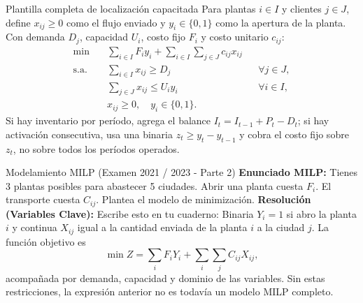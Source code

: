 \begin{formulas}{Plantilla completa de localización capacitada}
Para plantas $i\in I$ y clientes $j\in J$, define $x_{ij}\ge0$ como el flujo
enviado y $y_i\in\{0,1\}$ como la apertura de la planta. Con demanda
$D_j$, capacidad $U_i$, costo fijo $F_i$ y costo unitario $c_{ij}$:
\[
\begin{aligned}
\min\quad &\sum_{i\in I}F_i y_i+\sum_{i\in I}\sum_{j\in J}c_{ij}x_{ij}\\
\text{s.a.}\quad &\sum_{i\in I}x_{ij}\ge D_j &&\forall j\in J,\\
&\sum_{j\in J}x_{ij}\le U_i y_i &&\forall i\in I,\\
&x_{ij}\ge0,\quad y_i\in\{0,1\}.
\end{aligned}
\]
Si hay inventario por período, agrega el balance
$I_{t}=I_{t-1}+P_t-D_t$; si hay activación consecutiva, usa una binaria
$z_t\ge y_t-y_{t-1}$ y cobra el costo fijo sobre $z_t$, no sobre todos los
períodos operados.
\end{formulas}

\vspace{0.4cm}
\begin{ejercicio}{Modelamiento MILP (Examen 2021 / 2023 - Parte 2)}
\textbf{Enunciado MILP:} Tienes 3 plantas posibles para abastecer 5 ciudades. Abrir una planta cuesta $F_i$. El transporte cuesta $C_{ij}$. Plantea el modelo de minimización.
\textbf{Resolución (Variables Clave):}
Escribe esto en tu cuaderno:
Binaria $Y_i = 1$ si abro la planta $i$ y continua $X_{ij}$ igual a la
cantidad enviada de la planta $i$ a la ciudad $j$. La función objetivo es
\[
\min Z=\sum_iF_iY_i+\sum_i\sum_j C_{ij}X_{ij},
\]
acompañada por demanda, capacidad y dominio de las variables. Sin estas
restricciones, la expresión anterior no es todavía un modelo MILP completo.
\end{ejercicio}
